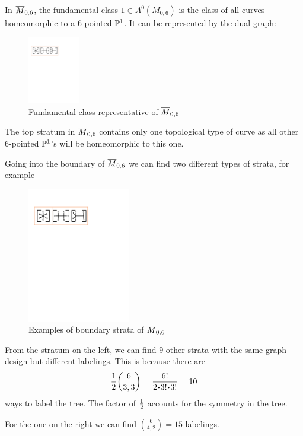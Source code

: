 \documentclass[12pt]{memoir}
\begin{document}
\begin{Ex}
    In $\overline M_{0,6}$, the fundamental class $1\in A^0(M_{0,6})$ is the class of all curves homeomorphic to a 6-pointed $\mathbb{P}^1$. It can be represented by the dual graph:\par
    \begin{figure}[h!]
        \centering
        \includegraphics[width=0.2\textwidth, trim= 1.32cm 20.75cm 16.53cm 3.9cm,clip]{figs/FigsDNnotability.pdf}
        \caption{Fundamental class representative of $\overline{M}_{0,6}$}
        \label{fig:3.1-fundamental class}
    \end{figure} 
    The top stratum in $\overline M_{0,6}$ contains only one topological type of curve as all other $6$-pointed $\mathbb{P}^1$'s will be homeomorphic to this one.
\end{Ex}

\begin{Ex}
    Going into the boundary of $\overline M_{0,6}$ we can find two different types of strata, for example
    \begin{figure}[h!]
        \centering
        \includegraphics[width=0.4\textwidth, trim= 5.12cm 20.75cm 8.93cm 3.9cm,clip]{figs/FigsDNnotability.pdf}
        \caption{Examples of boundary strata of $\overline{M}_{0,6}$}
        \label{fig:3.2-boundary-strata-M06c1}
    \end{figure} 
    From the stratum on the left, we can find $9$ other strata with the same graph design but different labelings. This is because there are 
    $$\half\binom{6}{3,3}=\frac{6!}{2\.3!\.3!}=10$$
    ways to label the tree. The factor of $\half$ accounts for the symmetry in the tree.\par
    For the one on the right we can find $\binom{6}{4,2}=15$ labelings.
\end{Ex}
\end{document}
